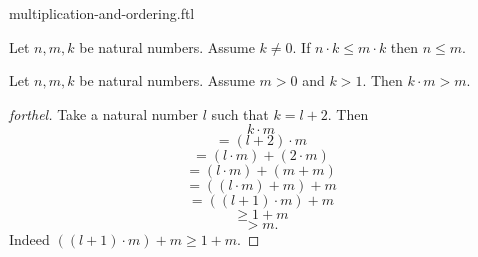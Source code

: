 \documentclass{naproche-library}
\begin{document}
\begin{smodule}{multiplication-and-ordering.ftl}
  \begin{corollary}[forthel,id=ARITHMETIC_06_4374428949413888,printid]
    Let $n, m, k$ be natural numbers.
    Assume $k \neq 0$.
    If $n \cdot k \leq m \cdot k$ then $n \leq m$.
  \end{corollary}

  \begin{proposition}[forthel,id=ARITHMETIC_06_8813409145454592,printid]
    Let $n, m, k$ be natural numbers.
    Assume $m > 0$ and $k > 1$.
    Then $k \cdot m > m$.
  \end{proposition}
  \begin{proof}[forthel]
    Take a natural number $l$ such that $k = l + 2$.
    Then
    \[  k \cdot m                       \]
    \[    = (l + 2) \cdot m             \]
    \[    = (l \cdot m) + (2 \cdot m)   \]
    \[    = (l \cdot m) + (m + m)       \]
    \[    = ((l \cdot m) + m) + m       \]
    \[    = ((l + 1) \cdot m) + m       \]
    \[    \geq 1 + m                    \]
    \[    > m.                          \]
    Indeed $((l + 1) \cdot m) + m \geq 1 + m$.
  \end{proof}
\end{smodule}
\end{document}
